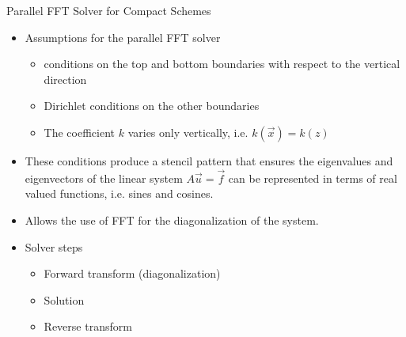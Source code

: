 \documentclass[handout]{beamer}
\begin{document}
\begin{frame}{Parallel FFT Solver for Compact Schemes}

\begin{itemize}
\item Assumptions for the parallel FFT solver
\begin{itemize}
\item \somm conditions on the top and bottom boundaries with respect to the vertical direction
\item Dirichlet conditions on the other boundaries
\item The coefficient $k$ varies only vertically, i.e. $k(\vec{x}) = k(z)$\\
\end{itemize}

\item These conditions produce a stencil pattern that ensures the eigenvalues and eigenvectors of the linear system $A\vec{u}=\vec{f}$ can be represented in terms of real valued functions, i.e. sines and cosines.\\

\item Allows the use of FFT for the diagonalization of the system.\\

\item Solver steps
\begin{itemize}
\item Forward transform (diagonalization)
\item Solution
\item Reverse transform
\end{itemize}
\end{itemize}


%
%


\end{frame}
\end{document}
